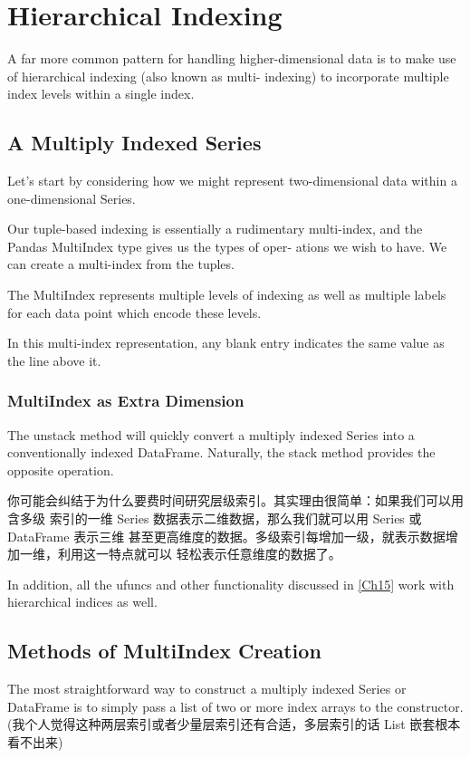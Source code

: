 \chapter{Hierarchical Indexing\label{Ch17}}
A far more common pattern for handling
higher-dimensional data is to make use of hierarchical indexing (also known as multi-
indexing) to incorporate multiple index levels within a single index.
\section{A Multiply Indexed Series}
Let’s start by considering how we might represent two-dimensional data within a
one-dimensional Series.

Our tuple-based indexing is essentially a
rudimentary multi-index, and the Pandas MultiIndex type gives us the types of oper‐
ations we wish to have. We can create a multi-index from the tuples.

The MultiIndex represents multiple levels of indexing as well as multiple labels for each data point which encode these
levels.

In this multi-index representation, any blank entry indicates the
same value as the line above it.

\subsection*{MultiIndex as Extra Dimension}

The unstack method will quickly convert a multiply
indexed Series into a conventionally indexed DataFrame. Naturally, the stack method provides the opposite operation.

你可能会纠结于为什么要费时间研究层级索引。其实理由很简单：如果我们可以用含多级
索引的一维 Series 数据表示二维数据，那么我们就可以用 Series 或 DataFrame 表示三维
甚至更高维度的数据。多级索引每增加一级，就表示数据增加一维，利用这一特点就可以
轻松表示任意维度的数据了。

In addition, all the ufuncs and other functionality discussed in \autoref{Ch15} work with
hierarchical indices as well.
\section{Methods of MultiIndex Creation}
The most straightforward way to construct a multiply indexed Series or DataFrame
is to simply pass a list of two or more index arrays to the constructor.(我个人觉得这种两层索引或者少量层索引还有合适，多层索引的话 List 嵌套根本看不出来)

